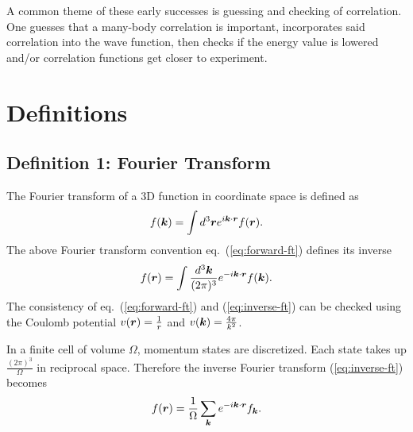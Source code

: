 
A common theme of these early successes is guessing and checking of correlation. One guesses that a many-body correlation is important, incorporates said correlation into the wave function, then checks if the energy value is lowered and/or correlation functions get closer to experiment. %

\section{Definitions}

\subsection{Definition 1: Fourier Transform}
The Fourier transform of a 3D function in coordinate space is defined as
\begin{align}
f(\boldsymbol{k}) = \int d^3\boldsymbol{r} e^{i\boldsymbol{k}\cdot\boldsymbol{r}} f(\boldsymbol{r}). \label{eq:forward-ft}
\end{align}
The above Fourier transform convention eq.~(\ref{eq:forward-ft}) defines its inverse
\begin{align}
f(\boldsymbol{r}) = \int \frac{d^3\boldsymbol{k}}{(2\pi)^3} e^{-i\boldsymbol{k}\cdot\boldsymbol{r}} f(\boldsymbol{k}). \label{eq:inverse-ft}
\end{align}
The consistency of eq.~(\ref{eq:forward-ft}) and (\ref{eq:inverse-ft}) can be checked using the Coulomb potential $v(\boldsymbol{r})=\frac{1}{r}$ and $v(\boldsymbol{k})=\frac{4\pi}{k^2}$. 

In a finite cell of volume $\Omega$, momentum states are discretized. Each state takes up $\frac{(2\pi)^3}{\Omega}$ in reciprocal space. Therefore the inverse Fourier transform (\ref{eq:inverse-ft}) becomes
\begin{align}
f(\boldsymbol{r}) = \frac{1}{\Omega} \sum\limits_{\boldsymbol{k}} e^{-i\boldsymbol{k}\cdot\boldsymbol{r}} f_{\boldsymbol{k}}.
\end{align}

